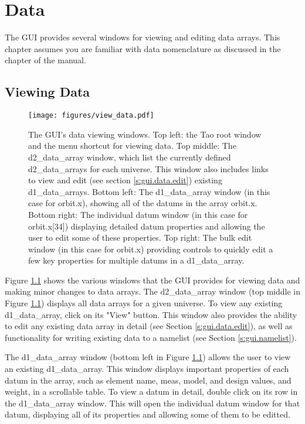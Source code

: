 \chapter{Data}
\label{s:gui.data}

The GUI provides several windows for viewing and editing data arrays. This chapter assumes you are
familiar with \tao data nomenclature as discussed in the  chapter of the \tao manual.

\section{Viewing Data}
\label{s:gui.data.view}

\begin{figure}
\centering
\texttt{[image: figures/view\_data.pdf]}
\caption[The GUI's data viewing windows.]{The GUI's data viewing windows.
Top left: the Tao root window and the menu shortcut for viewing data.
Top middle: The d2_data_array window, which list the currently defined d2_data_arrays for each universe.
This window also includes links to view and edit (see section \ref{s:gui.data.edit}) existing d1_data_arrays.
Bottom left: The d1_data_array window (in this case for orbit.x), showing all of the datums in the array orbit.x.
Bottom right: The individual datum window (in this case for orbit.x[34]) displaying detailed datum properties and allowing the user to edit some of these properties.
Top right: The bulk edit window (in this case for orbit.x) providing controls to quickly edit a few key properties for multiple datums in a d1_data_array.}
\label{fig:gui.data.view}
\end{figure}

Figure \ref{fig:gui.data.view} shows the various windows that the GUI provides for viewing data and making minor changes to data arrays.
The d2_data_array window (top middle in Figure \ref{fig:gui.data.view}) displays all data arrays for a given universe.
To view any existing d1_data_array, click on its "View" button.
This window also provides the ability to edit any existing data array in detail (see Section \ref{s:gui.data.edit}), as well as functionality for writing existing data to a namelist (see Section \ref{s:gui.namelist}).

The d1_data_array window (bottom left in Figure \ref{fig:gui.data.view}) allows the user to view an existing d1_data_array.
This window displays important properties of each datum in the array, such as element name, meas, model, and design values, and weight, in a scrollable table.
To view a datum in detail, double click on its row in the d1_data_array window.
This will open the individual datum window for that datum, displaying all of its properties and allowing some of them to be editted.

